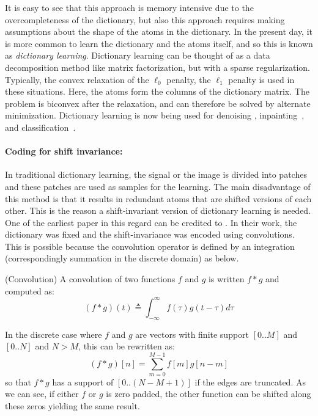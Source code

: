 It is easy to see that this approach is memory intensive due to the overcompleteness of the dictionary, but also this approach requires making assumptions about the shape of the atoms in the dictionary. In the present day, it is more common to learn the dictionary and the atoms itself, and so this is known as \emph{dictionary learning}. Dictionary learning can be thought of as a data decomposition method like matrix factorization, but with a sparse regularization. Typically, the convex relaxation of the $\ell_0$ penalty, the $\ell_1$ penalty is used in these situations. Here, the atoms form the columns of the dictionary matrix. 
The problem is biconvex after the relaxation, and can therefore be solved by alternate minimization. Dictionary learning is now being used for denoising \mainak{[ref]}, inpainting~\citep{mairal2009online}, and classification~\citep{mairal2009supervised}. 

\paragraph{Coding for shift invariance:}
In traditional dictionary learning, the signal or the image is divided into patches and these patches are used as samples for the learning. The main disadvantage of this method is that it results in redundant atoms that are shifted versions of each other. This is the reason a shift-invariant version of dictionary learning is needed. One of the earliest paper in this regard can be credited to \cite{lewicki1999coding}. In their work, the dictionary was fixed and the shift-invariance was encoded using convolutions. 
This is possible because the convolution operator is defined by an integration (correspondingly summation in the discrete domain) as below.
\vspace{\parskip}
%
\begin{definition}{(Convolution)}
A convolution of two functions $f$ and $g$ is written $f * g$ and computed as:
\begin{equation}
(f * g)(t) \triangleq \int_{-\infty}^{\infty} f(\tau)g(t-\tau) d\tau
\end{equation}
\end{definition}

In the discrete case where $f$ and $g$ are vectors with finite support $[0..M]$ and $[0..N]$ and $N > M$, this can be rewritten as:
%
\begin{equation}
(f * g)[n] = \sum_{m=0}^{M-1} f[m]g[n-m]
\end{equation}
%
so that $f * g$ has a support of $[0..(N - M + 1)]$ if the edges are truncated. As we can see, if either $f$ or $g$ is zero padded, the other function can be shifted along these zeros yielding the same result.

